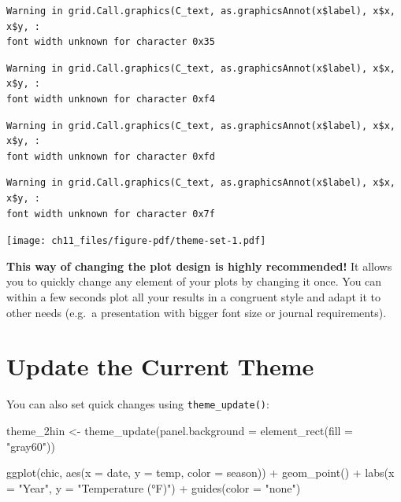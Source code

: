 \documentclass[
  letterpaper,
  DIV=11,
  numbers=noendperiod]{scrreprt}
\newenvironment{Shaded}{\begin{snugshade}}{\end{snugshade}}
\newcommand{\AttributeTok}[1]{\textcolor[rgb]{0.40,0.45,0.13}{#1}}
\newcommand{\FunctionTok}[1]{\textcolor[rgb]{0.28,0.35,0.67}{#1}}
\newcommand{\NormalTok}[1]{\textcolor[rgb]{0.00,0.23,0.31}{#1}}
\newcommand{\OtherTok}[1]{\textcolor[rgb]{0.00,0.23,0.31}{#1}}
\newcommand{\SpecialCharTok}[1]{\textcolor[rgb]{0.37,0.37,0.37}{#1}}
\newcommand{\StringTok}[1]{\textcolor[rgb]{0.13,0.47,0.30}{#1}}
\begin{document}
\begin{verbatim}
Warning in grid.Call.graphics(C_text, as.graphicsAnnot(x$label), x$x, x$y, :
font width unknown for character 0x35
\end{verbatim}

\begin{verbatim}
Warning in grid.Call.graphics(C_text, as.graphicsAnnot(x$label), x$x, x$y, :
font width unknown for character 0xf4
\end{verbatim}

\begin{verbatim}
Warning in grid.Call.graphics(C_text, as.graphicsAnnot(x$label), x$x, x$y, :
font width unknown for character 0xfd
\end{verbatim}

\begin{verbatim}
Warning in grid.Call.graphics(C_text, as.graphicsAnnot(x$label), x$x, x$y, :
font width unknown for character 0x7f
\end{verbatim}

\texttt{[image: ch11\_files/figure-pdf/theme-set-1.pdf]}

\textbf{This way of changing the plot design is highly recommended!} It
allows you to quickly change any element of your plots by changing it
once. You can within a few seconds plot all your results in a congruent
style and adapt it to other needs (e.g.~a presentation with bigger font
size or journal requirements).

\section{Update the Current Theme}\label{update-the-current-theme}

You can also set quick changes using \texttt{theme\_update()}:

\begin{Shaded}
\begin{Highlighting}[]
\NormalTok{theme\_2hin }\OtherTok{\textless{}{-}} \FunctionTok{theme\_update}\NormalTok{(}\AttributeTok{panel.background =} \FunctionTok{element\_rect}\NormalTok{(}\AttributeTok{fill =} \StringTok{"gray60"}\NormalTok{))}

\FunctionTok{ggplot}\NormalTok{(chic, }\FunctionTok{aes}\NormalTok{(}\AttributeTok{x =}\NormalTok{ date, }\AttributeTok{y =}\NormalTok{ temp, }\AttributeTok{color =}\NormalTok{ season)) }\SpecialCharTok{+}
  \FunctionTok{geom\_point}\NormalTok{() }\SpecialCharTok{+} \FunctionTok{labs}\NormalTok{(}\AttributeTok{x =} \StringTok{"Year"}\NormalTok{, }\AttributeTok{y =} \StringTok{"Temperature (°F)"}\NormalTok{) }\SpecialCharTok{+} \FunctionTok{guides}\NormalTok{(}\AttributeTok{color =} \StringTok{"none"}\NormalTok{)}
\end{Highlighting}
\end{Shaded}
\end{document}
